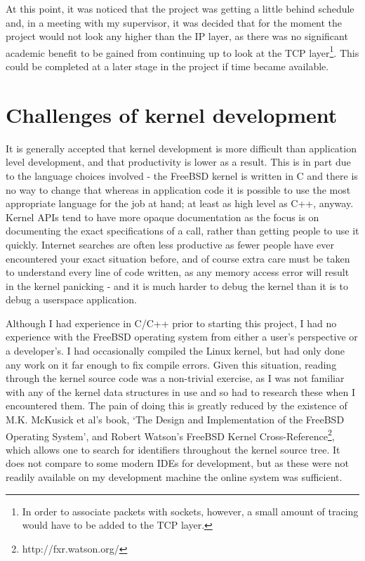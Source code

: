 \documentclass[a4paper,12pt,twoside,openright]{report}
\begin{document}
	At this point, it was noticed that the project was getting a little behind schedule and, in a meeting with my supervisor, it was decided that for the moment the project would not look any higher than the IP layer, as there was no significant academic benefit to be gained from continuing up to look at the TCP layer\footnote{In order to associate packets with sockets, however, a small amount of tracing would have to be added to the TCP layer.}. This could be completed at a later stage in the project if time became available.
	
	\section{Challenges of kernel development}
	
	It is generally accepted that kernel development is more difficult than application level development, and that productivity is lower as a result. This is in part due to the language choices involved - the FreeBSD kernel is written in C and there is no way to change that whereas in application code it is possible to use the most appropriate language for the job at hand; at least as high level as C++, anyway. Kernel APIs tend to have more opaque documentation as the focus is on documenting the exact specifications of a call, rather than getting people to use it quickly. Internet searches are often less productive as fewer people have ever encountered your exact situation before, and of course extra care must be taken to understand every line of code written, as any memory access error will result in the kernel panicking - and it is much harder to debug the kernel than it is to debug a userspace application.
	
	Although I had experience in C/C++ prior to starting this project, I had no experience with the FreeBSD operating system from either a user's perspective or a developer's. I had occasionally compiled the Linux kernel, but had only done any work on it far enough to fix compile errors. Given this situation, reading through the kernel source code was a non-trivial exercise, as I was not familiar with any of the kernel data structures in use and so had to research these when I encountered them. The pain of doing this is greatly reduced by the existence of M.K. McKusick et al's book, `The Design and Implementation of the FreeBSD Operating System'\cite{McKusick:2014:DIF:2659919}, and Robert Watson's FreeBSD Kernel Cross-Reference\footnote{http://fxr.watson.org/}, which allows one to search for identifiers throughout the kernel source tree. It does not compare to some modern IDEs for development, but as these were not readily available on my development machine the online system was sufficient.
	
\end{document}
